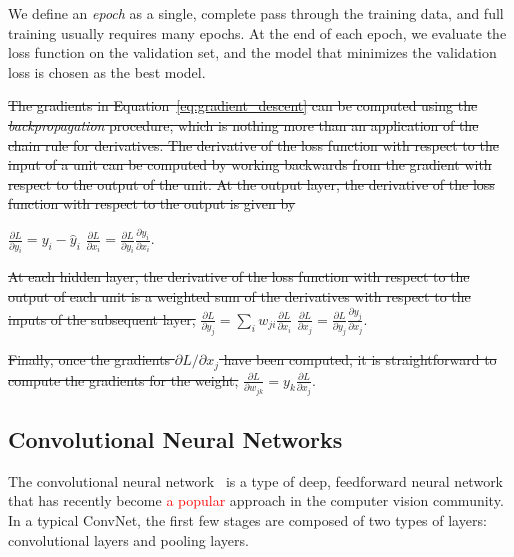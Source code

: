 \documentclass[fleqn,usenatbib]{mnras}
\newcommand{\changed}[1]{\textcolor{red}{#1}}
\begin{document}
We define an \textit{epoch} as a single, complete pass through the training data,
and full training usually requires many epochs.
At the end of each epoch, we evaluate the loss function on the validation set,
and the model that minimizes the validation loss is chosen as the best model.

\sout{ The gradients in Equation~\ref{eq:gradient_descent} can be computed using the \textit{backpropagation} procedure, which is nothing more than an application of the chain rule for derivatives.  The derivative of the loss function with respect to the input of a unit can be computed by working backwards from the gradient with respect to the output of the unit.  At the output layer, the derivative of the loss function with respect to the output is given by }

\sout{$ \frac{ \partial L }{ \partial y_i } = y_i - \hat{y}_i $}
\sout{$ \frac{ \partial L }{ \partial x_i } = \frac{ \partial L }{ \partial y_i } \frac{ \partial y_i }{ \partial x_i }.  $}

\sout{ At each hidden layer, the derivative of the loss function with respect to the output of each unit is a weighted sum of the derivatives with respect to the inputs of the subsequent layer, }
\sout{$ \frac{ \partial L }{ \partial y_j } = \sum_{i} w_{ji} \frac{ \partial L }{ \partial x_i} $}
\sout{$ \frac{ \partial L }{ \partial x_j } = \frac{ \partial L }{ \partial y_j } \frac{ \partial y_j }{ \partial x_j }.  $}

\sout{ Finally, once the gradients $\partial L / \partial x_j$ have been computed, it is straightforward to compute the gradients for the weight, }
\sout{$ \frac{\partial L}{\partial w_{jk}} = y_k \frac{\partial L}{\partial x_j}.  $}


\subsection{Convolutional Neural Networks}
  \label{sec:convnet}

The convolutional neural network~\citep[ConvNet;][]{fukushima1980neocognitron,lecun1998gradient}
is a type of deep, feedforward neural network
that has recently become
\changed{
a popular
}
approach in the computer vision community.
In a typical ConvNet, the first few stages are composed of two types of layers: 
convolutional layers and pooling layers.
\end{document}

